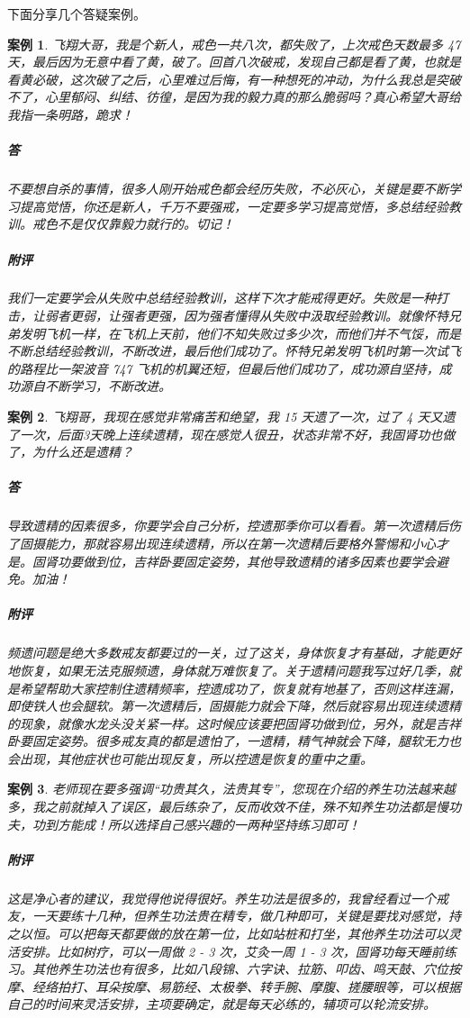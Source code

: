 \documentclass[fontset=founder]{ctexart}
\newtheorem{case}{案例}
\begin{document}
下面分享几个答疑案例。

\begin{case}
    飞翔大哥，我是个新人，戒色一共八次，都失败了，上次戒色天数最多 47 天，最后因为无意中看了黄，破了。回首八次破戒，发现自己都是看了黄，也就是看黄必破，这次破了之后，心里难过后悔，有一种想死的冲动，为什么我总是突破不了，心里郁闷、纠结、彷徨，是因为我的毅力真的那么脆弱吗？真心希望大哥给我指一条明路，跪求！
    \subparagraph{答} 不要想自杀的事情，很多人刚开始戒色都会经历失败，不必灰心，关键是要不断学习提高觉悟，你还是新人，千万不要强戒，一定要多学习提高觉悟，多总结经验教训。戒色不是仅仅靠毅力就行的。切记！
    \subparagraph{附评} 我们一定要学会从失败中总结经验教训，这样下次才能戒得更好。失败是一种打击，让弱者更弱，让强者更强，因为强者懂得从失败中汲取经验教训。就像怀特兄弟发明飞机一样，在飞机上天前，他们不知失败过多少次，而他们并不气馁，而是不断总结经验教训，不断改进，最后他们成功了。怀特兄弟发明飞机时第一次试飞的路程比一架波音 747 飞机的机翼还短，但最后他们成功了，成功源自坚持，成功源自不断学习，不断改进。
\end{case}

\begin{case}
    飞翔哥，我现在感觉非常痛苦和绝望，我 15 天遗了一次，过了 4 天又遗了一次，后面3天晚上连续遗精，现在感觉人很丑，状态非常不好，我固肾功也做了，为什么还是遗精？
    \subparagraph{答} 导致遗精的因素很多，你要学会自己分析，控遗那季你可以看看。第一次遗精后伤了固摄能力，那就容易出现连续遗精，所以在第一次遗精后要格外警惕和小心才是。固肾功要做到位，吉祥卧要固定姿势，其他导致遗精的诸多因素也要学会避免。加油！
    \subparagraph{附评} 频遗问题是绝大多数戒友都要过的一关，过了这关，身体恢复才有基础，才能更好地恢复，如果无法克服频遗，身体就万难恢复了。关于遗精问题我写过好几季，就是希望帮助大家控制住遗精频率，控遗成功了，恢复就有地基了，否则这样连漏，即使铁人也会腿软。第一次遗精后，固摄能力就会下降，然后就容易出现连续遗精的现象，就像水龙头没关紧一样。这时候应该要把固肾功做到位，另外，就是吉祥卧要固定姿势。很多戒友真的都是遗怕了，一遗精，精气神就会下降，腿软无力也会出现，其他症状也可能出现反复，所以控遗是恢复的重中之重。
\end{case}

\begin{case}
    老师现在要多强调“功贵其久，法贵其专”，您现在介绍的养生功法越来越多，我之前就掉入了误区，最后练杂了，反而收效不佳，殊不知养生功法都是慢功夫，功到方能成！所以选择自己感兴趣的一两种坚持练习即可！
    \subparagraph{附评} 这是净心者的建议，我觉得他说得很好。养生功法是很多的，我曾经看过一个戒友，一天要练十几种，但养生功法贵在精专，做几种即可，关键是要找对感觉，持之以恒。可以把每天都要做的放在第一位，比如站桩和打坐，其他养生功法可以灵活安排。比如树疗，可以一周做 2 - 3 次，艾灸一周 1 - 3 次，固肾功每天睡前练习。其他养生功法也有很多，比如八段锦、六字诀、拉筋、叩齿、鸣天鼓、穴位按摩、经络拍打、耳朵按摩、易筋经、太极拳、转手腕、摩腹、搓腰眼等，可以根据自己的时间来灵活安排，主项要确定，就是每天必练的，辅项可以轮流安排。
\end{case}
\end{document}
